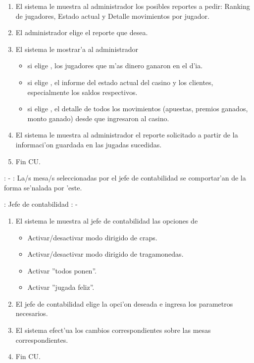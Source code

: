 \begin{enumerate}
\item El sistema le muestra al administrador los posibles reportes a pedir: Ranking de jugadores, Estado actual y Detalle movimientos por jugador.
\item El administrador elige el reporte que desea.
\item El sistema le mostrar'a al administrador
	\begin{itemize}
	\item si elige , los jugadores que m'as dinero ganaron en el d'ia.
	\item si elige , el informe del estado actual del casino y los clientes, especialmente los saldos respectivos.
	\item si elige , el detalle de todos los movimientos (apuestas, premios ganados, monto ganado) desde que ingresaron al casino.
	\end{itemize}
\item El sistema le muestra al administrador el reporte solicitado a partir de la informaci'on guardada en las jugadas sucedidas.
\item Fin CU.
\end{enumerate}




: - \newline
\indent{}: La/s mesa/s seleccionadas por el jefe de contabilidad se comportar'an de la forma se'nalada por 'este.

: Jefe de contabilidad \newline
\indent{}: -

\begin{enumerate}
\item El sistema le muestra al jefe de contabilidad las opciones de
	\begin{itemize}
	\item Activar/desactivar modo dirigido de craps.
	\item Activar/desactivar modo dirigido de tragamonedas.
	\item Activar ''todos ponen''.
	\item Activar ''jugada feliz''.
	\end{itemize}
\item El jefe de contabilidad elige la opci'on deseada e ingresa los parametros necesarios.
\item El sistema efect'ua los cambios correspondientes sobre las mesas correspondientes.
\item Fin CU.
\end{enumerate}


